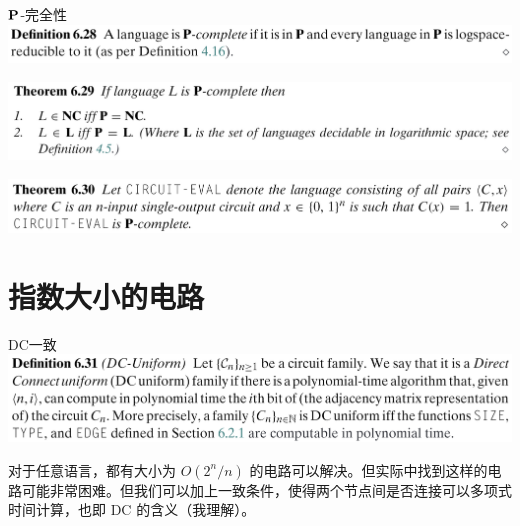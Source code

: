 \documentclass[UTF8,aspectratio=169,mathserif]{beamer}
\begin{document}
	\begin{frame}{$\bf P$-完全性}
		\includegraphics[width=\linewidth]{../../5 & 6/note.assets/image-20210427190230118.png}\newline
		
		\includegraphics[width=\linewidth]{../../5 & 6/note.assets/image-20210427190510329.png}\newline
		
		\includegraphics[width=\linewidth]{../../5 & 6/note.assets/image-20210427190538551.png}
	\end{frame}
	
	\section{指数大小的电路}
	\begin{frame}{DC一致}
		\includegraphics[width=\linewidth]{../../5 & 6/note.assets/image-20210427192246775.png}\newline
		
		对于任意语言，都有大小为 $O(2^n/n)$ 的电路可以解决。但实际中找到这样的电路可能非常困难。但我们可以加上一致条件，使得两个节点间是否连接可以多项式时间计算，也即 DC 的含义（我理解）。
		
	\end{frame}
\end{document}
